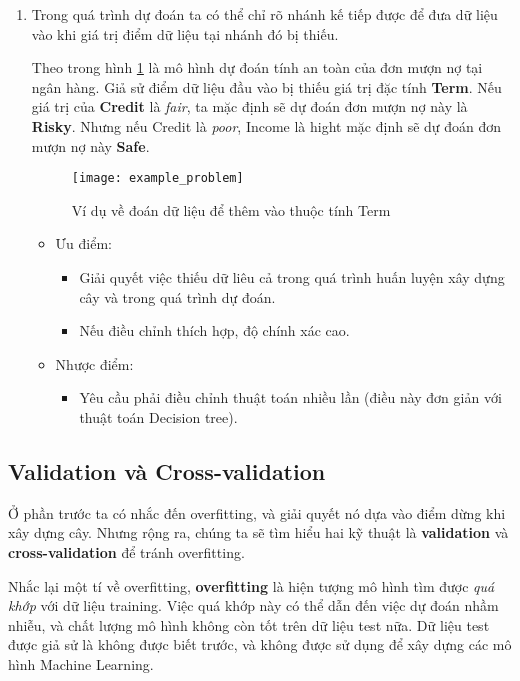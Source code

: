 \documentclass[../main-report.tex]{subfiles}
\begin{document}
\begin{enumerate}
\item Trong quá trình dự đoán ta có thể chỉ rõ nhánh kế tiếp được để đưa dữ liệu vào khi giá trị điểm dữ liệu tại nhánh đó bị thiếu.

\begin{example}
Theo trong hình \ref{fig:ex_term_problem} là mô hình dự đoán tính an toàn của đơn mượn nợ tại ngân hàng. Giả sử điểm dữ liệu đầu vào bị thiếu giá trị đặc tính \textbf{Term}. Nếu giá trị của \textbf{Credit} là \emph{fair}, ta mặc định sẽ dự đoán đơn mượn nợ này là \textbf{Risky}. Nhưng nếu Credit là \emph{poor}, Income là hight mặc định sẽ dự đoán đơn mượn nợ này \textbf{Safe}.
\end{example}

\begin{figure}[ht!]
\centering\texttt{[image: example\_problem]}
\caption{Ví dụ về đoán dữ liệu để thêm vào thuộc tính Term}
\label{fig:ex_term_problem}
\end{figure}

\begin{itemize}
\item Ưu điểm:
\begin{itemize}
\item Giải quyết việc thiếu dữ liêu cả trong quá trình huấn luyện xây dựng cây và trong quá trình dự đoán.
\item Nếu điều chỉnh thích hợp, độ chính xác cao.
\end{itemize}
\item Nhược điểm:
\begin{itemize}
\item Yêu cầu phải điều chỉnh thuật toán nhiều lần (điều này đơn giản với thuật toán Decision tree).
\end{itemize}
\end{itemize}
\end{enumerate}

\subsection{Validation và Cross-validation}
Ở phần trước ta có nhắc đến overfitting, và giải quyết nó dựa vào điểm dừng khi xây dựng cây. Nhưng rộng ra, chúng ta sẽ tìm hiểu hai kỹ thuật là \textbf{validation} và \textbf{cross-validation} để tránh overfitting.

Nhắc lại một tí về overfitting, \textbf{overfitting} là hiện tượng mô hình tìm được \emph{quá khớp} với dữ liệu training. Việc quá khớp này có thể dẫn đến việc dự đoán nhầm nhiễu, và chất lượng mô hình không còn tốt trên dữ liệu test nữa. Dữ liệu test được giả sử là không được biết trước, và không được sử dụng để xây dựng các mô hình Machine Learning.
\end{document}
